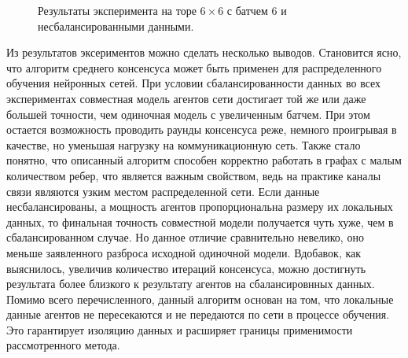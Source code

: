 \documentclass[a4paper,article,14pt]{extarticle}
\begin{document}
\begin{figure}[H]
\begin{center}
\caption{ \label{fig:torus6x6_unbalanced_b6}
     Результаты эксперимента на торе $6\times 6$ с батчем 6 и несбалансированными данными.}
\end{center}
\end{figure}

\pagebreak
{}
Из результатов эксериментов можно сделать несколько выводов. Становится ясно, что алгоритм среднего консенсуса может быть применен для распределенного обучения нейронных сетей. При условии сбалансированности данных во всех экспериментах совместная модель агентов сети достигает той же или даже большей точности, чем одиночная модель с увеличенным батчем. При этом остается возможность проводить раунды консенсуса реже, немного проигрывая в качестве, но уменьшая нагрузку на коммуникационную сеть. Также стало понятно, что описанный алгоритм способен корректно работать в графах с малым количеством ребер, что является важным свойством, ведь на практике каналы связи являются узким местом распределенной сети. Если данные несбалансированы, а мощность агентов пропорциональна размеру их локальных данных, то финальная точность совместной модели получается чуть хуже, чем в сбалансированном случае. Но данное отличие сравнительно невелико, оно меньше заявленного разброса исходной одиночной модели. Вдобавок, как выяснилось, увеличив количество итераций консенсуса, можно достигнуть результата более близкого к результату агентов на сбалансировнных данных. Помимо всего перечисленного, данный алгоритм основан на том, что локальные данные агентов не пересекаются и не передаются по сети в процессе обучения. Это гарантирует изоляцию данных и расширяет границы применимости рассмотренного метода.
\end{document}
